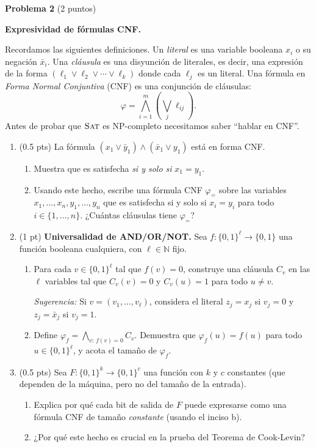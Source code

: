 \documentclass[12pt, letterpaper]{article}
\newcommand{\SAT}{\textsc{Sat}}
\newcommand{\problema}[2]{%
  \bigskip
  \noindent\textbf{Problema #1} \textnormal{(#2 puntos)}\par\smallskip
}
\begin{document}
\problema{2}{2} \textbf{Expresividad de fórmulas CNF.}

Recordamos las siguientes definiciones.  Un \emph{literal} es una variable
booleana $x_i$ o su negación $\bar{x}_i$.  Una \emph{cláusula} es una
disyunción de literales, es decir, una expresión de la forma
$(\ell_1 \vee \ell_2 \vee \cdots \vee \ell_k)$ donde cada $\ell_j$ es un
literal.  Una fórmula en \emph{Forma Normal Conjuntiva} (CNF) es una
conjunción de cláusulas:
\[
  \varphi = \bigwedge_{i=1}^{m} \left(\bigvee_{j} \ell_{ij}\right).
\]
Antes de probar que $\SAT$ es NP-completo necesitamos saber ``hablar en CNF''.

\begin{enumerate}[label=\alph*)]

\item (0.5 pts) La fórmula $(x_1 \vee \bar{y}_1) \wedge (\bar{x}_1 \vee y_1)$
  está en forma CNF.
  \begin{enumerate}[label=\roman*.]
    \item Muestra que es satisfecha \emph{si y solo si} $x_1 = y_1$.
    \item Usando este hecho, escribe una fórmula CNF $\varphi_{=}$ sobre las
      variables $x_1,\ldots,x_n,y_1,\ldots,y_n$ que es satisfecha si y solo
      si $x_i = y_i$ para todo $i \in \{1,\ldots,n\}$.  ¿Cuántas cláusulas
      tiene $\varphi_{=}$?
  \end{enumerate}

\item (1 pt) \textbf{Universalidad de AND/OR/NOT.}
  Sea $f : \{0,1\}^\ell \to \{0,1\}$ una función booleana cualquiera, con
  $\ell \in \mathbb{N}$ fijo.
  \begin{enumerate}[label=\roman*.]
    \item Para cada $v \in \{0,1\}^\ell$ tal que $f(v) = 0$, construye una
      cláusula $C_v$ en las $\ell$ variables tal que $C_v(v) = 0$ y
      $C_v(u) = 1$ para todo $u \neq v$.

      \textit{Sugerencia:} Si $v = (v_1, \ldots, v_\ell)$, considera el
      literal $z_j = x_j$ si $v_j = 0$ y $z_j = \bar{x}_j$ si $v_j = 1$.

    \item Define $\varphi_f = \bigwedge_{v:\, f(v)=0} C_v$.  Demuestra que
      $\varphi_f(u) = f(u)$ para todo $u \in \{0,1\}^\ell$, y acota el
      tamaño de $\varphi_f$.
  \end{enumerate}

\item (0.5 pts) Sea $F : \{0,1\}^k \to \{0,1\}^c$ una función con $k$ y $c$
  constantes (que dependen de la máquina, pero no del tamaño de la entrada).
  \begin{enumerate}[label=\roman*.]
    \item Explica por qué cada bit de salida de $F$ puede expresarse como una
      fórmula CNF de tamaño \emph{constante} (usando el inciso b).
    \item ¿Por qué este hecho es crucial en la prueba del Teorema de
      Cook-Levin?
  \end{enumerate}

\end{enumerate}
\end{document}
